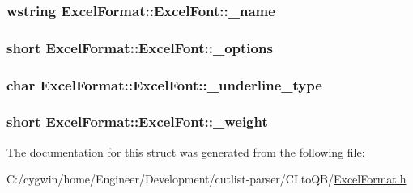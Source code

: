 \subsubsection[{\+\_\+name}]{\setlength{\rightskip}{0pt plus 5cm}wstring Excel\+Format\+::\+Excel\+Font\+::\+\_\+name}\label{struct_excel_format_1_1_excel_font_a578bfc55ed101c6606ea402545300236}
\hypertarget{struct_excel_format_1_1_excel_font_a042a44bd71503ebba7ad1d99d4963ccd}{}
\subsubsection[{\+\_\+options}]{\setlength{\rightskip}{0pt plus 5cm}short Excel\+Format\+::\+Excel\+Font\+::\+\_\+options}\label{struct_excel_format_1_1_excel_font_a042a44bd71503ebba7ad1d99d4963ccd}
\hypertarget{struct_excel_format_1_1_excel_font_ae4fc6f7f0271572e59a850baf422d24e}{}
\subsubsection[{\+\_\+underline\+\_\+type}]{\setlength{\rightskip}{0pt plus 5cm}char Excel\+Format\+::\+Excel\+Font\+::\+\_\+underline\+\_\+type}\label{struct_excel_format_1_1_excel_font_ae4fc6f7f0271572e59a850baf422d24e}
\hypertarget{struct_excel_format_1_1_excel_font_a38244ef586fecd5f46df7e649bceb671}{}
\subsubsection[{\+\_\+weight}]{\setlength{\rightskip}{0pt plus 5cm}short Excel\+Format\+::\+Excel\+Font\+::\+\_\+weight}\label{struct_excel_format_1_1_excel_font_a38244ef586fecd5f46df7e649bceb671}


The documentation for this struct was generated from the following file\+:\begin{DoxyCompactItemize}
\item 
C\+:/cygwin/home/\+Engineer/\+Development/cutlist-\/parser/\+C\+Lto\+Q\+B/\hyperlink{_c_lto_q_b_2_excel_format_8h}{Excel\+Format.\+h}\end{DoxyCompactItemize}
